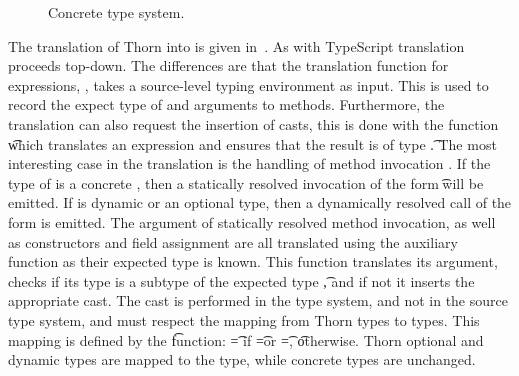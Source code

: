 \documentclass[a4paper,USenglish]{tex/lipics-v2016}
\begin{document}
\begin{figure}[hb]	
	
	\hrulefill  
	\vspace{0.5mm}
	
	\begin{mathpar}  
	\end{mathpar}
	
	\hrulefill
	\caption{Concrete type system.}\label{thts2}
\end{figure}	

The translation of Thorn into \kafka is given in~. As with
TypeScript translation proceeds top-down. The differences are that the
translation function for expressions, \TRG{\e}\Env, takes a source-level
typing environment as input. This is used to record the expect type of \this
and arguments \x to methods. Furthermore, the translation can also request
the insertion of casts, this is done with the function \TAG{\e}\Env\t which
translates an expression and ensures that the result is of type \t. The most
interesting case in the translation is the handling of method invocation
\Call\e\m\ep. If the type of \e is a concrete \C, then a statically resolved
invocation of the form \KCall\e\m\ep\t\tp will be emitted. If \e is dynamic
or an optional type, then a dynamically resolved call of the form
\DynCall\e\m\ep is emitted.  The argument of statically resolved method
invocation, as well as constructors and field assignment are all translated
using the auxiliary function as their expected type is known.  This function
translates its argument, checks if its type is a subtype of the expected
type \t, and if not it inserts the appropriate cast.  The cast is performed
in the \kafka type system, and not in the source type system, and must
respect the mapping from Thorn types to \kafka types.  This mapping is
defined by the \kty\t function: \kty\t = \any if \t=\dt\C or \t=\any, \t
otherwise.  Thorn optional and dynamic types are mapped to the \any type,
while concrete types are unchanged.
\end{document}
